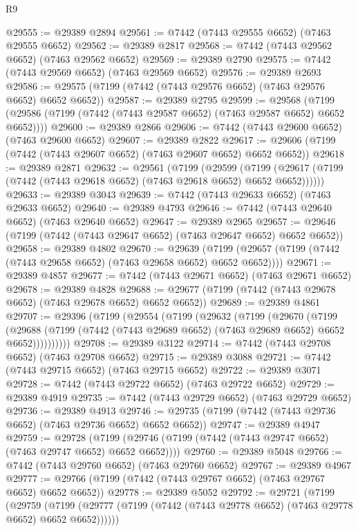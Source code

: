 \begin{lexlean}{R9}
\begin{coremodule}
@29555 := @29389 @2894
@29561 := @7442 (@7443 @29555 @6652) (@7463 @29555 @6652)
@29562 := @29389 @2817
@29568 := @7442 (@7443 @29562 @6652) (@7463 @29562 @6652)
@29569 := @29389 @2790
@29575 := @7442 (@7443 @29569 @6652) (@7463 @29569 @6652)
@29576 := @29389 @2693
@29586 := @29575 (@7199 (@7442 (@7443 @29576 @6652) (@7463 @29576 @6652) @6652 @6652))
@29587 := @29389 @2795
@29599 := @29568
    (@7199 (@29586 (@7199 (@7442 (@7443 @29587 @6652) (@7463 @29587 @6652) @6652 @6652))))
@29600 := @29389 @2866
@29606 := @7442 (@7443 @29600 @6652) (@7463 @29600 @6652)
@29607 := @29389 @2822
@29617 := @29606 (@7199 (@7442 (@7443 @29607 @6652) (@7463 @29607 @6652) @6652 @6652))
@29618 := @29389 @2871
@29632 := @29561
    (@7199
      (@29599
        (@7199 (@29617 (@7199 (@7442 (@7443 @29618 @6652) (@7463 @29618 @6652) @6652 @6652))))))
@29633 := @29389 @3043
@29639 := @7442 (@7443 @29633 @6652) (@7463 @29633 @6652)
@29640 := @29389 @4793
@29646 := @7442 (@7443 @29640 @6652) (@7463 @29640 @6652)
@29647 := @29389 @2965
@29657 := @29646 (@7199 (@7442 (@7443 @29647 @6652) (@7463 @29647 @6652) @6652 @6652))
@29658 := @29389 @4802
@29670 := @29639
    (@7199 (@29657 (@7199 (@7442 (@7443 @29658 @6652) (@7463 @29658 @6652) @6652 @6652))))
@29671 := @29389 @4857
@29677 := @7442 (@7443 @29671 @6652) (@7463 @29671 @6652)
@29678 := @29389 @4828
@29688 := @29677 (@7199 (@7442 (@7443 @29678 @6652) (@7463 @29678 @6652) @6652 @6652))
@29689 := @29389 @4861
@29707 := @29396
    (@7199
      (@29554
        (@7199
          (@29632
            (@7199
              (@29670
                (@7199
                  (@29688
                    (@7199 (@7442 (@7443 @29689 @6652) (@7463 @29689 @6652) @6652 @6652))))))))))
@29708 := @29389 @3122
@29714 := @7442 (@7443 @29708 @6652) (@7463 @29708 @6652)
@29715 := @29389 @3088
@29721 := @7442 (@7443 @29715 @6652) (@7463 @29715 @6652)
@29722 := @29389 @3071
@29728 := @7442 (@7443 @29722 @6652) (@7463 @29722 @6652)
@29729 := @29389 @4919
@29735 := @7442 (@7443 @29729 @6652) (@7463 @29729 @6652)
@29736 := @29389 @4913
@29746 := @29735 (@7199 (@7442 (@7443 @29736 @6652) (@7463 @29736 @6652) @6652 @6652))
@29747 := @29389 @4947
@29759 := @29728
    (@7199 (@29746 (@7199 (@7442 (@7443 @29747 @6652) (@7463 @29747 @6652) @6652 @6652))))
@29760 := @29389 @5048
@29766 := @7442 (@7443 @29760 @6652) (@7463 @29760 @6652)
@29767 := @29389 @4967
@29777 := @29766 (@7199 (@7442 (@7443 @29767 @6652) (@7463 @29767 @6652) @6652 @6652))
@29778 := @29389 @5052
@29792 := @29721
    (@7199
      (@29759
        (@7199 (@29777 (@7199 (@7442 (@7443 @29778 @6652) (@7463 @29778 @6652) @6652 @6652))))))

\end{coremodule}
\end{lexlean}
